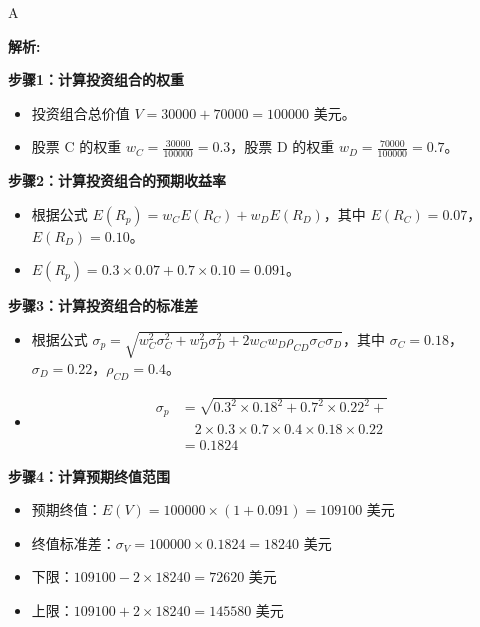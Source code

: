 \documentclass{article}
\newenvironment{explanation}
{\textbf{解析:}\par}
{\par}
\begin{document}
    \begin{correctanswer}
        A
    \end{correctanswer}
    
    \begin{explanation}
    \textbf{步骤1：计算投资组合的权重}
    \begin{itemize}
        \item 投资组合总价值 \(V = 30000 + 70000 = 100000\) 美元。
        \item 股票 C 的权重 \(w_C = \frac{30000}{100000} = 0.3\)，股票 D 的权重 \(w_D = \frac{70000}{100000} = 0.7\)。
    \end{itemize}
    
    \textbf{步骤2：计算投资组合的预期收益率}
    \begin{itemize}
        \item 根据公式 \(E(R_p) = w_C E(R_C) + w_D E(R_D)\)，其中 \(E(R_C) = 0.07\)，\(E(R_D) = 0.10\)。
        \item \(E(R_p) = 0.3 \times 0.07 + 0.7 \times 0.10 = 0.091\)。
    \end{itemize}
    
    \textbf{步骤3：计算投资组合的标准差}
    \begin{itemize}
        \item 根据公式 \(\sigma_p = \sqrt{w_C^2 \sigma_C^2 + w_D^2 \sigma_D^2 + 2 w_C w_D \rho_{CD} \sigma_C \sigma_D}\)，其中 \(\sigma_C = 0.18\)，\(\sigma_D = 0.22\)，\(\rho_{CD} = 0.4\)。
        \item
\begin{align*}
\sigma_p &= \sqrt{0.3^2 \times 0.18^2 + 0.7^2 \times 0.22^2 + {}} \\
         &\quad {2 \times 0.3 \times 0.7 \times 0.4 \times 0.18 \times 0.22} \\
         &= 0.1824
\end{align*}
    
    \end{itemize}
    
    \textbf{步骤4：计算预期终值范围}
    \begin{itemize}
        \item 预期终值：\(E(V) = 100000 \times (1 + 0.091) = 109100\) 美元
        \item 终值标准差：\(\sigma_V = 100000 \times 0.1824 = 18240\) 美元
        \item 下限：\(109100 - 2 \times 18240 = 72620 \) 美元
        \item 上限：\(109100 + 2 \times 18240 = 145580 \) 美元
    \end{itemize}
    \end{explanation}
    
\end{document}
